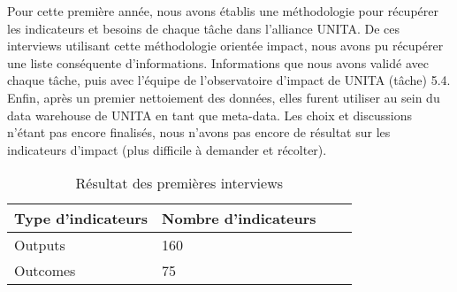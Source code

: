 Pour cette première année, nous avons établis une méthodologie pour récupérer les indicateurs et besoins de chaque tâche dans l'alliance UNITA. De ces interviews utilisant cette méthodologie orientée impact, nous avons pu récupérer une liste conséquente d'informations. Informations que nous avons validé avec chaque tâche, puis avec l'équipe de l'observatoire d'impact de UNITA (tâche) 5.4. Enfin, après un premier nettoiement des données, elles furent utiliser au sein du data warehouse de UNITA en tant que meta-data. Les choix et discussions n'étant pas encore finalisés, nous n'avons pas encore de résultat sur les indicateurs d'impact (plus difficile à demander et récolter). 
\begin{table}[h]
  \caption{Résultat des premières interviews}
  \begin{center}
    \begin{tabular}{|l|l|l|l|} \hline
    \textbf{Type d'indicateurs} & \textbf{Nombre d'indicateurs} \\ \hline
    Outputs & 160 \\ \hline
    Outcomes & 75 \\ \hline
    \end{tabular}
  \end{center}
\end{table}
